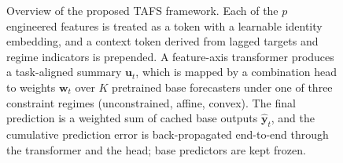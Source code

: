 \begin{figure}[t]
\caption{Overview of the proposed TAFS framework. Each of the $p$ engineered features is treated as a token with a learnable identity embedding, and a context token derived from lagged targets and regime indicators is prepended. A feature-axis transformer produces a task-aligned summary $\mathbf{u}_t$, which is mapped by a combination head to weights $\mathbf{w}_t$ over $K$ pretrained base forecasters under one of three constraint regimes (unconstrained, affine, convex). The final prediction is a weighted sum of cached base outputs $\hat{\mathbf{y}}_t$, and the cumulative prediction error is back-propagated end-to-end through the transformer and the head; base predictors are kept frozen.}
\label{fig:architecture}
\end{figure}
